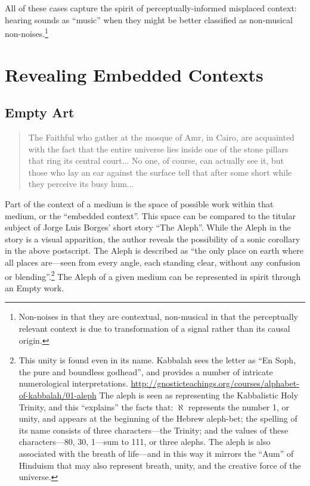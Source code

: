 \documentclass{thesis}
\begin{document}
All of these cases capture the spirit of perceptually-informed misplaced context: hearing sounds as ``music'' when they might be better classified as non-musical non-noises.\footnote{Non-noises in that they are contextual, non-musical in that the perceptually relevant context is due to transformation of a signal rather than its causal origin.}

\chapter{Revealing Embedded Contexts}

\section{Empty Art}

	\begin{quote}
	The Faithful who gather at the mosque of Amr, in Cairo, are acquainted with the fact that the entire universe lies inside one of the stone pillars that ring its central court... No one, of course, can actually see it, but those who lay an ear against the surface tell that after some short while they perceive its busy hum...
	\end{quote}

Part of the context of a medium is the space of possible work within that medium, or the ``embedded context''. This space can be compared to the titular subject of Jorge Luis Borges' short story ``The Aleph''\cite{borges_aleph_2004}. While the Aleph in the story is a visual apparition, the author reveals the possibility of a sonic corollary in the above postscript. The Aleph is described as ``the only place on earth where all places are---seen from every angle, each standing clear, without any confusion or blending''.\footnote{This unity is found even in its name. Kabbalah sees the letter as ``En Soph, the pure and boundless godhead'', and provides a number of intricate numerological interpretations. \url{http://gnosticteachings.org/courses/alphabet-of-kabbalah/01-aleph} The aleph is seen as representing the Kabbalistic Holy Trinity, and this ``explains'' the facts that: $\aleph$ represents the number 1, or unity, and appears at the beginning of the Hebrew aleph-bet; the spelling of its name consists of three characters---the Trinity; and the values of these characters---80, 30, 1---sum to 111, or three alephs. The aleph is also associated with the breath of life---and in this way it mirrors the ``Aum'' of Hinduism that may also represent breath, unity, and the creative force of the universe.} The Aleph of a given medium can be represented in spirit through an Empty work.
\end{document}
